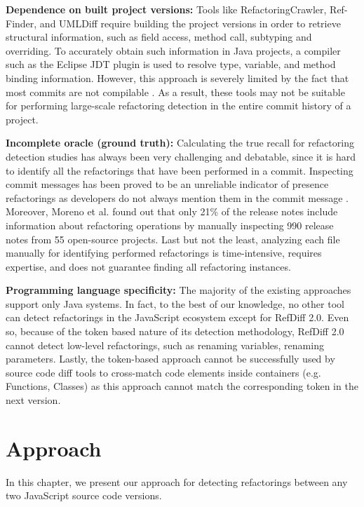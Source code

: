 \documentclass[letterpaper,12pt,onecolumn,final]{report}
\begin{document}
\textbf{Dependence on built project versions:} Tools like RefactoringCrawler, Ref-Finder, and UMLDiff require building the project versions in order to retrieve structural information, such as field access, method call, subtyping and overriding. To accurately obtain such information in Java projects, a compiler such as the Eclipse JDT plugin is used to resolve type, variable, and method binding information. However, this approach is severely limited by the fact that most commits are not compilable \cite{Tufano2017}. As a result, these tools may not be suitable for performing large-scale refactoring detection in the entire commit history of a project.

\textbf{Incomplete oracle (ground truth):} Calculating the true recall for refactoring detection studies has always been very challenging and debatable, since it is hard to identify all the refactorings that have been performed in a commit. Inspecting commit messages has been proved to be an unreliable indicator of presence refactorings as developers do not always mention them in the commit message \cite{MurphyHill2012}. Moreover, Moreno et al. \cite{laura2017arena} found out that only 21\% of the release notes include information about refactoring operations by manually inspecting 990 release notes from 55 open-source projects. Last but not the least, analyzing each file manually for identifying performed refactorings is time-intensive, requires expertise, and does not guarantee finding all refactoring instances. 

\textbf{Programming language specificity:} The majority of the existing approaches support only Java systems. In fact, to the best of our knowledge, no other tool can detect refactorings in the JavaScript ecosystem except for RefDiff 2.0. Even so, because of the token based nature of its detection methodology, RefDiff 2.0 cannot detect low-level refactorings, such as renaming variables, renaming parameters. Lastly, the token-based approach cannot be successfully used by source code diff tools to cross-match code elements inside containers (e.g. Functions, Classes) as this approach cannot match the corresponding token in the next version.

\chapter{Approach}

In this chapter, we present our approach for detecting refactorings between any two JavaScript source code versions.
\end{document}
